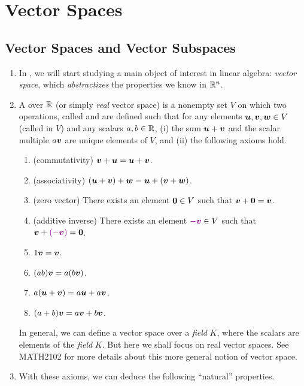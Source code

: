 \section{Vector Spaces}
\label{sect:vector-spaces}
\subsection{Vector Spaces and Vector Subspaces}
\begin{enumerate}
\item In , we will start studying a main object of
interest in linear algebra: \emph{vector space}, which \emph{abstractizes} the
properties we know in \(\mathbb{R}^n\).
\item A  over \(\mathbb{R}\) (or simply \emph{real} vector space) is
a nonempty set \(V\) on which two operations, called  and
 are defined such that for any elements
\(\vb*{u},\vb*{v},\vb*{w}\in V\) (called  in \(V\)) and any
scalars \(a,b\in\mathbb{R}\), (i) the sum \(\vb*{u}+\vb*{v}\) and the scalar multiple
\(a\vb*{v}\) are unique elements of \(V\), and (ii) the following axioms hold.
\begin{enumerate}[label={(\arabic*)}]
\item (commutativity) \(\vb*{v}+\vb*{u}=\vb*{u}+\vb*{v}\).
\item (associativity) \((\vb*{u}+\vb*{v})+\vb*{w}=\vb*{u}+(\vb*{v}+\vb*{w})\).
\item (zero vector) There exists an element \(\vb*{0}\in V\) such that \(\vb*{v}+\vb*{0}=\vb*{v}\).
\item (additive inverse) There exists an element \({\color{violet}-\vb*{v}}\in V\) such that
\(\vb*{v}+{\color{violet}(-\vb*{v})}=\vb*{0}\).
\item \(1\vb*{v}=\vb*{v}\).
\item \((ab)\vb*{v}=a(b\vb*{v})\).
\item \(a(\vb*{u}+\vb*{v})=a\vb*{u}+a\vb*{v}\).
\item \((a+b)\vb*{v}=a\vb*{v}+b\vb*{v}\).
\end{enumerate}
\begin{note}
In general, we can define a vector space over a \emph{field} \(K\), where the
scalars are elements of the \emph{field} \(K\). But here we shall focus on real
vector spaces. See MATH2102 for more details about this more general notion of
vector space.
\end{note}
\item With these axioms, we can deduce the following ``natural'' properties.

\end{enumerate}
